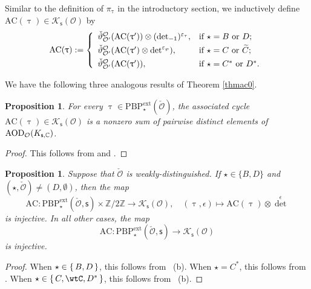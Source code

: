 \documentclass[12pt,a4paper]{amsart}
\def\abs#1{\left|{#1}\right|}
\newcommand{\CK}{{\mathcal {K}}}
\newcommand{\CO}{{\mathcal {O}}}
\newcommand{\g}{\mathfrak g}
\newcommand{\Z}{\mathbb{Z}}
\numberwithin{equation}{section}
\newtheorem{prop}[thm]{Proposition}
\theoremstyle{remark}
\def\PBPe{\mathrm{PBP}^{\mathrm{ext}}}
\begin{document}


Similar to the definition of $\pi_\uptau$ in the introductory section, we inductively define
$\mathrm{AC}(\uptau)\in \CK_{\mathsf s}(\CO) $ by
 \[
   \mathrm{AC}(\uptau):=\left\{
     \begin{array}{ll}
         \check \vartheta_{\CO'}^{\CO}(\mathrm{AC}(\uptau'))\otimes ({\det}_{-1})^{\varepsilon_{\tau}}, &\hbox{if  $\star=B$ or $D$}; \smallskip\\
         \check \vartheta_{\CO'}^{\CO}(\mathrm{AC}(\uptau')\otimes \det^{\varepsilon_{\wp}}), &\hbox{if $\star=C$ or $\widetilde C$};\smallskip \\
              \check \vartheta_{\CO'}^{\CO}(\mathrm{AC}(\uptau')), &\hbox{if $\star=C^*$ or $D^*$}. \\
            \end{array}
   \right.
 \]

We have the following three analogous results of Theorem \ref{thmac0}.

\begin{prop}\label{thmac1}
 For every $\uptau\in \PBPe_\star(\check \CO)$,  the associated cycle $\mathrm{AC}(\uptau)\in \CK_{\mathsf s}(\CO)$ is a nonzero  sum of  pairwise distinct elements of $\mathrm{AOD}_{\CO}(K_{\mathsf s, \C})$.
\end{prop}

\begin{proof}
  This follows from  and .
\end{proof}

\begin{prop}\label{thmac2}
Suppose that  $\check \CO$ is weakly-distinguished.  If $\star\in \{B,D\}$ and $(\star, \check \CO)\neq (D, \emptyset)$, then  the map
\[
\mathrm{AC}: \PBPe_\star(\check \CO,\mathsf s)\times \Z/2\Z \rightarrow  \CK_{\mathsf s}(\CO),\quad (\uptau, \epsilon)\mapsto \mathrm{AC}(\uptau)\otimes {\det}^{\epsilon}
\]
is injective. In all other cases, the
map
\[
\mathrm{AC}: \PBPe_\star(\check \CO,\mathsf s)\rightarrow  \CK_{\mathsf s}(\CO)
\]
is injective.
\end{prop}
\begin{proof}
When $\star\in \set{B,D}$, this follows from ~(b).
When $\star = C^{*}$, this follows from .
When $\star\in \set{C,\wtC,D^{*}}$, this follows from ~(b).
\end{proof}
\end{document}
